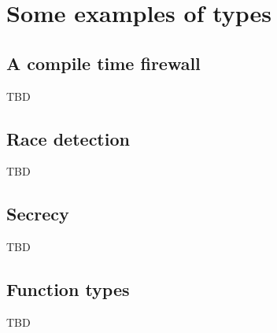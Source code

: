 \section{Some examples of types}
\subsection{A compile time firewall}
TBD

\subsection{Race detection}
TBD

\subsection{Secrecy}
TBD

\subsection{Function types}
TBD
